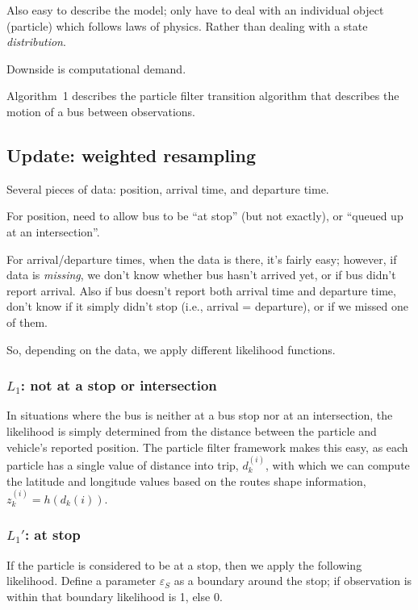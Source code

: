 \documentclass[draftcls,a4paper,onecolumn]{IEEEtran}\usepackage[]{graphicx}\usepackage[]{color}
\begin{document}
Also easy to describe the model;
only have to deal with an individual object (particle) which follows laws of physics.
Rather than dealing with a state \emph{distribution}.

Downside is computational demand.

Algorithm~1 describes the particle filter transition algorithm that
describes the motion of a bus between observations.



\subsection{Update: weighted resampling}


Several pieces of data: position, arrival time, and departure time.

For position, need to allow bus to be ``at stop'' (but not exactly),
or ``queued up at an intersection''.

For arrival/departure times, when the data is there, it's fairly easy;
however, if data is \emph{missing}, we don't know whether bus hasn't arrived yet,
or if bus didn't report arrival.
Also if bus doesn't report both arrival time and departure time,
don't know if it simply didn't stop (i.e., arrival = departure),
or if we missed one of them.

So, depending on the data, we apply different likelihood functions.


\subsubsection[L1]{$L_1$: not at a stop or intersection}

In situations where the bus is neither at a bus stop nor at an intersection,
the likelihood is simply determined from the distance between the particle and 
vehicle's reported position.
The particle filter framework makes this easy,
as each particle has a single value of distance into trip, $d_k^{(i)}$,
with which we can compute the latitude and longitude values based on 
the routes shape information, $z_k^{(i)} = h(d_k{(i)})$.


\subsubsection[L1b]{$L_1'$: at stop}

If the particle is considered to be at a stop, then we apply the following likelihood.
Define a parameter $\varepsilon_S$ as a boundary around the stop;
if observation is within that boundary likelihood is 1, else 0.
\end{document}
